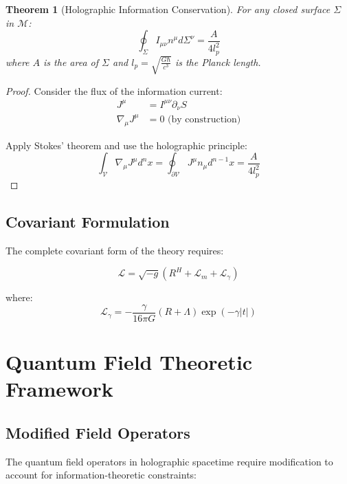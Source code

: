 \documentclass[12pt]{article}
\theoremstyle{plain}
\newtheorem{theorem}{Theorem}[section]
\theoremstyle{definition}
\theoremstyle{remark}
\begin{document}
\begin{theorem}[Holographic Information Conservation]
For any closed surface $\Sigma$ in $\mathcal{M}$:
\begin{equation}
\oint_{\Sigma} I_{\mu\nu}n^{\mu}d\Sigma^{\nu} = \frac{A}{4l_p^2}
\end{equation}
where $A$ is the area of $\Sigma$ and $l_p = \sqrt{\frac{G\hbar}{c^3}}$ is the Planck length.
\end{theorem}

\begin{proof}
Consider the flux of the information current:
\begin{align}
J^{\mu} &= I^{\mu\nu}\partial_{\nu}S \\
\nabla_{\mu}J^{\mu} &= 0 \text{ (by construction)}
\end{align}

Apply Stokes' theorem and use the holographic principle:
\begin{equation}
\int_{\mathcal{V}} \nabla_{\mu}J^{\mu}d^nx = \oint_{\partial\mathcal{V}} J^{\mu}n_{\mu}d^{n-1}x = \frac{A}{4l_p^2}
\end{equation}
\end{proof}

\subsection{Covariant Formulation}

The complete covariant form of the theory requires:

\begin{equation}
\mathcal{L} = \sqrt{-g}(R^H + \mathcal{L}_m + \mathcal{L}_{\gamma})
\end{equation}

where:
\begin{equation}
\mathcal{L}_{\gamma} = -\frac{\gamma}{16\pi G}(R + \Lambda)\exp(-\gamma|t|)
\end{equation}

\section{Quantum Field Theoretic Framework}

\subsection{Modified Field Operators}

The quantum field operators in holographic spacetime require modification to account for information-theoretic constraints:
\end{document}
